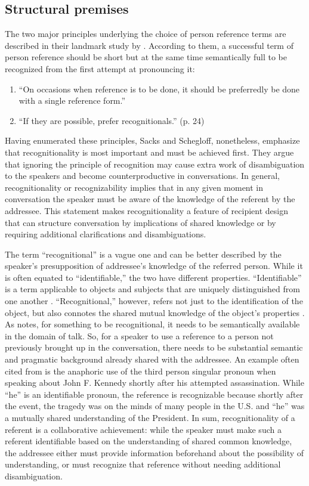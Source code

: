 \documentclass[12pt]{article}
\begin{document}
\subsection{Structural premises}
The two major principles underlying the choice of person reference terms are described in their landmark study by \textcite{sacks1979}. According to them, a successful term of person reference should be short but at the same time semantically full to be recognized from the first attempt at pronouncing it:
\begin{enumerate}
\item ``On occasions when reference is to be done, it should be preferredly be done with a single reference form.''
\item ``If they are possible, prefer recognitionals.'' (p. 24)
\end{enumerate}
Having enumerated these principles, Sacks and Schegloff, nonetheless, emphasize that recognitionality is most important and must be achieved first. They argue that ignoring the principle of recognition may cause extra work of disambiguation to the speakers and become counterproductive in conversations. In general, recognitionality or recognizability implies that in any given moment in conversation the speaker must be aware of the knowledge of the referent by the addressee. This statement makes recognitionality a feature of recipient design that can structure conversation by implications of shared knowledge or by requiring additional clarifications and disambiguations. 

The term ``recognitional'' is a vague one and can be better described by the speaker's presupposition of addressee's knowledge of the referred person. While it is often equated to ``identifiable,'' the two have different properties. ``Identifiable'' is a term applicable to objects and subjects that are uniquely distinguished from one another \parencite{clark1986, chafe1976}. ``Recognitional,'' however, refers not just to the identification of the object, but also connotes the shared mutual knowledge of the object's properties \parencite{clark1986, defornel1987, sacks1979}. As \textcite{chafe1976} notes, for something to be recognitional, it needs to be semantically available in the domain of talk. So, for a speaker to use a reference to a person not previously brought up in the conversation, there needs to be substantial semantic and pragmatic background already shared with the addressee. An example often cited from \textcite{schegloff2007} is the anaphoric use of the third person singular pronoun when speaking about John F. Kennedy shortly after his attempted assassination. While ``he'' is an identifiable pronoun, the reference is recognizable because shortly after the event, the tragedy was on the minds of many people in the U.S. and ``he'' was a mutually shared understanding of the President. In sum, recognitionality of a referent is a collaborative achievement: while the speaker must make such a referent identifiable based on the understanding of shared common knowledge, the addressee either must provide information beforehand about the possibility of understanding, or must recognize that reference without needing additional disambiguation.
\end{document}
